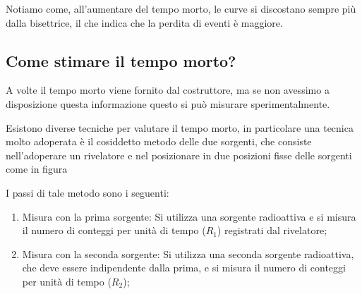 Notiamo come, all'aumentare del tempo morto, le curve si discostano sempre più dalla bisettrice, il che indica che la perdita di eventi è maggiore.

\subsection{Come stimare il tempo morto?}

A volte il tempo morto viene fornito dal costruttore, ma se non avessimo a disposizione questa informazione questo si può misurare sperimentalmente.

\begin{esempio}
   Esistono diverse tecniche per valutare il tempo morto, in particolare una tecnica molto adoperata è il cosiddetto metodo delle due sorgenti, che consiste nell'adoperare un rivelatore e nel posizionare in due posizioni fisse delle sorgenti come in figura
   \begin{figure}[H]
      \centering
    \end{figure}
   I passi di tale metodo sono i seguenti:
   \begin{enumerate}[leftmargin=0.5cm]
      \item Misura con la prima sorgente: Si utilizza una sorgente radioattiva e si misura il numero di conteggi per unità di tempo ($R_1$) registrati dal rivelatore;
      \item Misura con la seconda sorgente: Si utilizza una seconda sorgente radioattiva, che deve essere indipendente dalla prima, e si misura il numero di conteggi per unità di tempo ($R_2$);

\end{enumerate}
\end{esempio}
